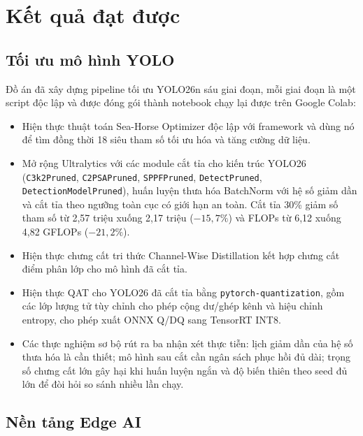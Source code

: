 \section{Kết quả đạt được}

\subsection{Tối ưu mô hình YOLO}

Đồ án đã xây dựng pipeline tối ưu YOLO26n sáu giai đoạn, mỗi giai đoạn là một
script độc lập và được đóng gói thành notebook chạy lại được trên Google Colab:
\begin{itemize}
  \item Hiện thực thuật toán Sea-Horse Optimizer độc lập với framework và dùng nó
        để tìm đồng thời 18 siêu tham số tối ưu hóa và tăng cường dữ liệu.
  \item Mở rộng Ultralytics với các module cắt tỉa cho kiến trúc YOLO26
        (\texttt{C3k2Pruned}, \texttt{C2PSAPruned}, \texttt{SPPFPruned},
        \texttt{DetectPruned}, \texttt{DetectionModelPruned}), huấn luyện thưa hóa
        BatchNorm với hệ số giảm dần và cắt tỉa theo ngưỡng toàn cục có giới hạn an
        toàn. Cắt tỉa 30\% giảm số tham số từ 2,57 triệu xuống 2,17 triệu ($-15{,}7\%$)
        và FLOPs từ 6,12 xuống 4,82 GFLOPs ($-21{,}2\%$).
  \item Hiện thực chưng cất tri thức Channel-Wise Distillation kết hợp chưng cất
        điểm phân lớp cho mô hình đã cắt tỉa.
  \item Hiện thực QAT cho YOLO26 đã cắt tỉa bằng \texttt{pytorch-quantization},
        gồm các lớp lượng tử tùy chỉnh cho phép cộng dư/ghép kênh và hiệu chỉnh
        entropy, cho phép xuất ONNX Q/DQ sang TensorRT INT8.
  \item Các thực nghiệm sơ bộ rút ra ba nhận xét thực tiễn: lịch giảm dần của hệ
        số thưa hóa là cần thiết; mô hình sau cắt cần ngân sách phục hồi đủ dài;
        trọng số chưng cất lớn gây hại khi huấn luyện ngắn và độ biến thiên theo
        seed đủ lớn để đòi hỏi so sánh nhiều lần chạy.
\end{itemize}

\subsection{Nền tảng Edge AI}


